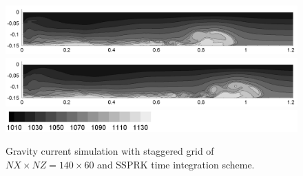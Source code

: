 \begin{figure}[htbp]
\begin{center}
\includegraphics[scale=0.55]{../figures/Staggered/Fig9case/060518c-SSPRK35-dt-00375-140-60/07.png}    \includegraphics[scale=0.55]{../figures/Staggered/Fig9case/060518c-SSPRK35-dt-00375-140-60/08.png}
\includegraphics[scale=0.55]{../figures/Staggered/Fig9case/label.png}
    \caption{Gravity current simulation with staggered grid of $NX \times NZ = 140 \times 60$ and SSPRK time integration scheme.}
\label{fig:060518c-SSPRK35-dt-00375-140-60}
  \end{center}
\end{figure}

